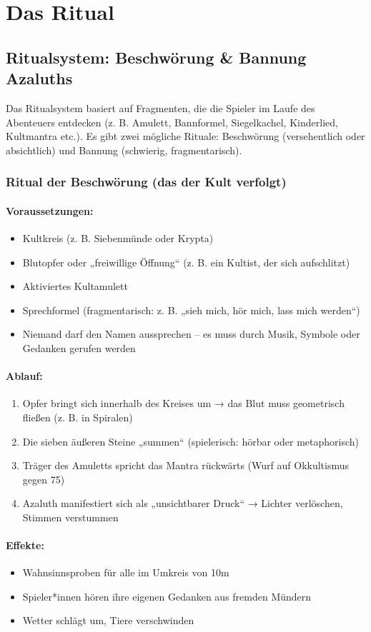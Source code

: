 \section{Das Ritual}
\subsection{Ritualsystem: Beschwörung \& Bannung Azaluths}
Das Ritualsystem basiert auf Fragmenten, die die Spieler im Laufe des Abenteuers entdecken (z. B. Amulett, Bannformel, Siegelkachel, Kinderlied, Kultmantra etc.). Es gibt zwei mögliche Rituale: Beschwörung (versehentlich oder absichtlich) und Bannung (schwierig, fragmentarisch).
\subsubsection{Ritual der Beschwörung (das der Kult verfolgt)}
\paragraph{Voraussetzungen:}
\begin{itemize}
\item Kultkreis (z. B. Siebenmünde oder Krypta)
\item Blutopfer oder „freiwillige Öffnung“ (z. B. ein Kultist, der sich aufschlitzt)
\item Aktiviertes Kultamulett
\item Sprechformel (fragmentarisch: z. B. „sieh mich, hör mich, lass mich werden“)
\item Niemand darf den Namen aussprechen – es muss durch Musik, Symbole oder Gedanken gerufen werden
\end{itemize}
\paragraph{Ablauf:}
\begin{enumerate}
\item Opfer bringt sich innerhalb des Kreises um → das Blut muss geometrisch fließen (z. B. in Spiralen)
\item Die sieben äußeren Steine „summen“ (spielerisch: hörbar oder metaphorisch)
\item Träger des Amuletts spricht das Mantra rückwärts (Wurf auf Okkultismus gegen 75)
\item Azaluth manifestiert sich als „unsichtbarer Druck“ → Lichter verlöschen, Stimmen verstummen
\end{enumerate}
\paragraph{Effekte:}
\begin{itemize}
\item Wahnsinnsproben für alle im Umkreis von 10m
\item Spieler*innen hören ihre eigenen Gedanken aus fremden Mündern
\item Wetter schlägt um, Tiere verschwinden
\end{itemize}
